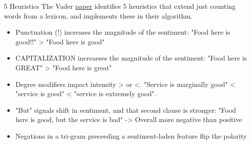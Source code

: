 \documentclass[
  10pt,
  ignorenonframetext,
  aspectratio=169]{beamer}
\begin{document}
\begin{frame}{5 Heuristics}
\protect\hypertarget{heuristics}{}
The Vader
\href{https://www.aaai.org/ocs/index.php/ICWSM/ICWSM14/paper/view/8109/8122}{paper}
identifies 5 heuristics that extend just counting words from a lexicon,
and implements these in their algorithm.

\begin{itemize}
  \item<1->Punctuation (!) increases the magnitude of the sentiment: "Food here is good!!" > "Food here is good"
  \item<2->CAPITALIZATION increaeses the magnitude of the sentiment: "Food here is GREAT" > "Food here is great"
  \item<3->Degree modifiers impact intensity > or <. "Service is marginally good" < "service is good" < "service is extremely good".
  \item<4->"But" signals shift in sentiment, and that second clause is stronger: "Food here is good, but the service is bad" -> Overall more negative than positive
  \item<5->Negations in a tri-gram preceeding a sentiment-laden feature flip the polarity
\end{itemize}
\end{frame}
\end{document}
